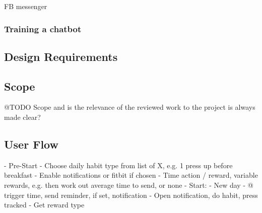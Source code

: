 FB messenger


\subsubsection*{Training a chatbot}

\subsection{Design Requirements}

\subsection{Scope}

@TODO Scope and is the relevance of the reviewed work to the project is always made clear?


\subsection{User Flow}
  - Pre-Start
    - Choose daily habit type from list of X, e.g. 1 press up before breakfast
    - Enable notifications or fitbit if chosen
    - Time action / reward, variable rewards, e.g. then work out average time to send, or none
  - Start:
    - New day
    - @ trigger time, send reminder, if set, notification
    - Open notification, do habit, press tracked
    - Get reward type
